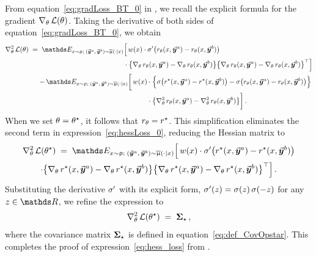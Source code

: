	From equation~\eqref{eq:gradLoss_BT_0} in , we recall the explicit formula for the gradient $\nabla_{\theta} \,  \mathcal{L}(\theta)$. Taking the derivative of both sides of equation~\eqref{eq:gradLoss_BT_0}, we obtain
	\begin{align}
		& \begin{aligned} 
		\hesstheta \Loss(\paratheta) \; = \; \Exp_{\prompt \sim \promptdistr; \; (\responseone, \, \responsetwo) \sim \responsedistravg(\cdot \mid \prompt)}
		& \Big[ \, \weight(\prompt) \cdot \divsigmoid \big( \rewardtheta(\context, \responseone) - \rewardtheta(\context, \responsetwo) \big) \\ 
		& \cdot \big\{ \gradtheta \rewardtheta(\prompt, \responseone) - \gradtheta \rewardtheta(\prompt, \responsetwo) \big\} \big\{ \gradtheta \rewardtheta(\prompt, \responseone) - \gradtheta \rewardtheta(\prompt, \responsetwo) \big\}^{\top} \Big] \end{aligned}   \notag  \\
		& \qquad \qquad \quad
		\begin{aligned} 
		- \, \Exp_{\prompt \sim \promptdistr; \; (\responseone, \, \responsetwo) \sim \responsedistravg(\cdot \mid \prompt)}
		\bigg[ \, \weight(\prompt) & \cdot \Big\{ \sigmoid \big( \rewardstar(\context, \responseone) - \rewardstar(\context, \responsetwo) \big) - \sigmoid \big( \rewardtheta(\context, \responseone) - \rewardtheta(\context, \responsetwo) \big) \Big\} \\ 
		& \cdot \big\{ \hesstheta \rewardtheta(\prompt, \responseone) - \hesstheta \rewardtheta(\prompt, \responsetwo) \big\} \bigg] \, .
		\end{aligned}
		\label{eq:hessLoss_0}
	\end{align}
	When we set $\theta = \theta^{\star}$, it follows that $r_{\theta} = r^{\star}$. This simplification eliminates the second term in expression~\eqref{eq:hessLoss_0}, reducing the Hessian matrix to
	\begin{multline*}
		\hesstheta \Loss(\parathetastar) \; = \; \Exp_{\prompt \sim \promptdistr; \; (\responseone, \, \responsetwo) \sim \responsedistravg(\cdot \mid \prompt)}
		\Big[ \, \weight(\prompt) \cdot \divsigmoid \big( \rewardstar(\context, \responseone) - \rewardstar(\context, \responsetwo) \big) \\ 
		\cdot \big\{ \gradtheta \rewardstar(\prompt, \responseone) - \gradtheta \rewardstar(\prompt, \responsetwo) \big\} \big\{ \gradtheta \rewardstar(\prompt, \responseone) - \gradtheta \rewardstar(\prompt, \responsetwo) \big\}^{\top} \Big] \, .
	\end{multline*}
	Substituting the derivative $\sigma'$ with its explicit form, $\sigma'(z) = \sigma(z) \, \sigma(-z)$ for any $z \in \Real$, we refine the expression to
	\begin{align*}
		\nabla_{\theta}^2 \,  \mathcal{L}(\theta^{\star}) \; = \; \boldsymbol{\Sigma}_{\star} \, ,
	\end{align*}
	where the covariance matrix $\boldsymbol{\Sigma}_{\star}$ is defined in equation~\eqref{eq:def_CovOpstar}.
	This completes the proof of expression~\eqref{eq:hess_loss} from .
	
